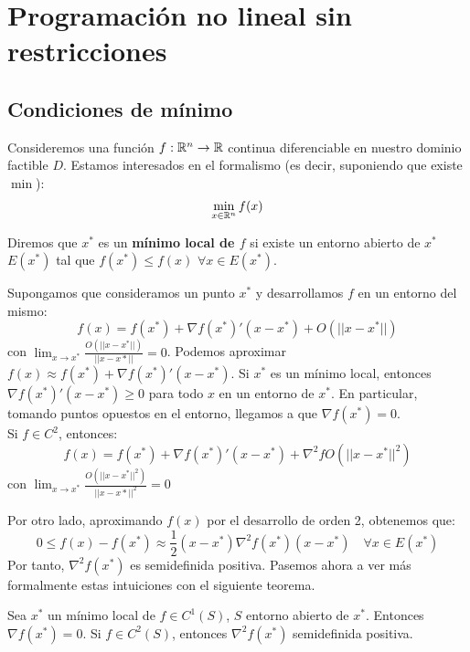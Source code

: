 \documentclass[PM.tex]{subfiles}
\begin{document}
\chapter{Programación no lineal sin restricciones}
\section{Condiciones de mínimo}
Consideremos una función $f : \mathbb{R}^n \to \mathbb{R}$ continua diferenciable en nuestro dominio factible $D$. Estamos interesados en el formalismo (es decir, suponiendo que existe $\min$):
\[ \min_{x \in \mathbb{R}^n} f(x)\]
\begin{defi} Diremos que $x^*$ es un \textbf{mínimo local de $f$} si existe un entorno abierto de $x^*$ $E(x^*)$ tal que $f(x^*) ≤ f(x)$ $\forall x \in E(x^*)$.
\end{defi}
\begin{obser}
Supongamos que consideramos un punto $x^*$ y desarrollamos $f$ en un entorno del mismo:
\[ f(x) = f(x^*) +  \nabla f(x^*)'(x-x^*) + O(||{x-x^*}||) \]
con $\lim_{x \to x^*} \frac{O(||{x-x^*}||)}{||{x-x*}||} = 0$.
Podemos aproximar $f(x) \approx f(x^*) + \nabla f(x^*)'(x-x^*)$. Si $x^*$ es un mínimo local, entonces $\nabla f(x^*)'(x-x^*) ≥ 0$ para todo $x$ en un entorno de $x^*$. En particular, tomando puntos opuestos en el entorno, llegamos a que  $\nabla f(x^*) = 0$. \\
Si $f \in C^2$, entonces:
\[ f(x) = f(x^*) +  \nabla f(x^*)'(x-x^*) + \nabla^2 f O(||{x-x^*}||^2) \]
con $\lim_{x \to x^*} \frac{O(||{x-x^*}||^2)}{||{x-x*}||^2} = 0$

Por otro lado, aproximando $f(x)$ por el desarrollo de orden 2, obtenemos que:
\[ 0 ≤ f(x) - f(x^*) \approx \frac{1}{2}(x-x^*) \nabla^2 f(x^*) (x-x^*) \quad \forall x \in E(x^*)\]
Por tanto, $\nabla^2 f(x^*)$ es semidefinida positiva. Pasemos ahora a ver más formalmente estas intuiciones con el siguiente teorema.
\end{obser}
\begin{theorem} Sea $x^*$ un mínimo local de $f \in C^1(S)$, $S$ entorno abierto de $x^*$. Entonces $\nabla f(x^*) = 0$. Si $f \in C^2(S)$, entonces $\nabla^2 f(x^*)$ semidefinida positiva.
\end{theorem}
\end{document}
